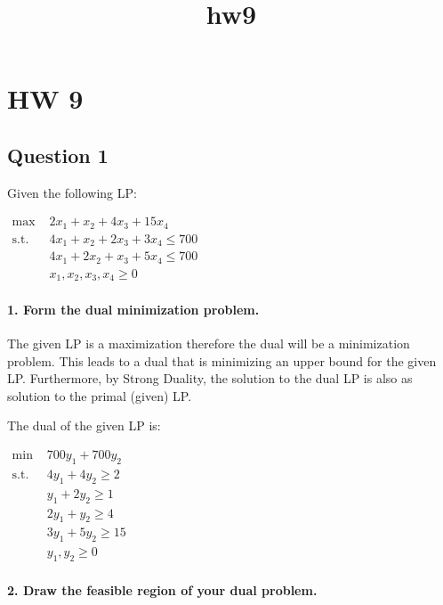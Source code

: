 \documentclass[11pt]{article}
\title{hw9}
\begin{document}
    
    
    \maketitle
    
    

    
    \hypertarget{hw-9}{%
\section{HW 9}\label{hw-9}}

    \hypertarget{question-1}{%
\subsection{Question 1}\label{question-1}}

Given the following LP:

\(\begin{align} \text{max } & 2x_1 + x_2 + 4x_3 + 15x_4 \\ \text{s.t. } & 4x_1 + x_2 + 2x_3 + 3x_4 \le 700 \\ & 4x_1 + 2x_2 + x_3 + 5x_4 \le 700 \\ & x_1, x_2, x_3, x_4 \ge 0 \end{align}\)

\hypertarget{form-the-dual-minimization-problem.}{%
\paragraph{1. Form the dual minimization
problem.}\label{form-the-dual-minimization-problem.}}

The given LP is a maximization therefore the dual will be a minimization
problem. This leads to a dual that is minimizing an upper bound for the
given LP. Furthermore, by Strong Duality, the solution to the dual LP is
also as solution to the primal (given) LP.

The dual of the given LP is:

\(\begin{align} \text{min } & 700y_1 + 700y_2 \\ \text{s.t. } & 4y_1 + 4y_2 \ge 2 \\ & y_1 + 2y_2 \ge 1 \\ & 2y_1 + y_2 \ge 4 \\ & 3y_1 + 5y_2 \ge 15 \\ & y_1, y_2 \ge 0 \end{align}\)

\hypertarget{draw-the-feasible-region-of-your-dual-problem.}{%
\paragraph{2. Draw the feasible region of your dual
problem.}\label{draw-the-feasible-region-of-your-dual-problem.}}
\end{document}
